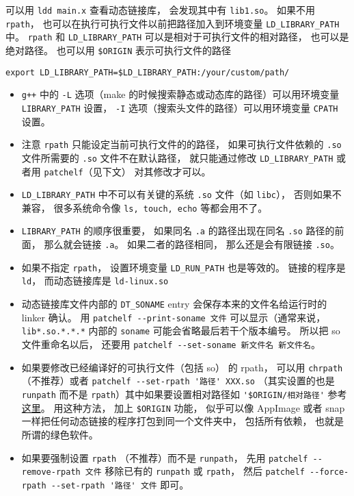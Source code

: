 可以用 \verb|ldd main.x| 查看动态链接库， 会发现其中有 \verb|lib1.so|。 如果不用 \verb|rpath|， 也可以在执行可执行文件以前把路径加入到环境变量 \verb`LD_LIBRARY_PATH` 中。 \verb|rpath| 和 \verb|LD_LIBRARY_PATH| 可以是相对于可执行文件的相对路径， 也可以是绝对路径。 也可以用 \verb|$ORIGIN| 表示可执行文件的路径
\begin{lstlisting}[language=none]
export LD_LIBRARY_PATH=$LD_LIBRARY_PATH:/your/custom/path/
\end{lstlisting}
\begin{itemize}
\item \verb|g++| 中的 \verb|-L| 选项（make 的时候搜索静态或动态库的路径）可以用环境变量 \verb|LIBRARY_PATH| 设置， \verb|-I| 选项（搜索头文件的路径）可以用环境变量 \verb|CPATH| 设置。
\item 注意 \verb|rpath| 只能设定当前可执行文件的的路径， 如果可执行文件依赖的 \verb|.so| 文件所需要的 \verb|.so| 文件不在默认路径， 就只能通过修改 \verb`LD_LIBRARY_PATH` 或者用 \verb|patchelf|（见下文） 对其修改才可以。
\item \verb|LD_LIBRARY_PATH| 中不可以有关键的系统 \verb|.so| 文件（如 \verb|libc|）， 否则如果不兼容， 很多系统命令像 \verb|ls, touch, echo| 等都会用不了。
\item \verb|LIBRARY_PATH| 的顺序很重要， 如果同名 \verb|.a| 的路径出现在同名 \verb|.so| 路径的前面， 那么就会链接 \verb|.a|。 如果二者的路径相同， 那么还是会有限链接 \verb|.so|。
\item 如果不指定 \verb|rpath|， 设置环境变量 \verb|LD_RUN_PATH| 也是等效的。 链接的程序是 \verb|ld|， 而动态链接库是 \verb|ld-linux.so|
\item 动态链接库文件内部的 \verb|DT_SONAME| entry 会保存本来的文件名给运行时的 linker 确认。 用 \verb|patchelf --print-soname 文件| 可以显示（通常来说， \verb|lib*.so.*.*.*| 内部的 \verb|soname| 可能会省略最后若干个版本编号。 所以把 so 文件重命名以后， 还要用 \verb|patchelf --set-soname 新文件名 新文件名|。
\item 如果要修改已经编译好的可执行文件（包括 so） 的 rpath， 可以用 \verb|chrpath| （不推荐）或者 \verb|patchelf --set-rpath '路径' XXX.so| （其实设置的也是 \verb|runpath| 而不是 \verb|rpath|）其中如果要设置相对路径如 \verb|'$ORIGIN/相对路径'| 参考\href{https://stackoverflow.com/questions/13769141/can-i-change-rpath-in-an-already-compiled-binary}{这里}。 用这种方法， 加上 \verb|$ORIGIN| 功能， 似乎可以像 AppImage 或者 snap 一样把任何动态链接的程序打包到同一个文件夹中， 包括所有依赖， 也就是所谓的绿色软件。
\item 如果要强制设置 \verb|rpath| （不推荐）而不是 \verb|runpath|， 先用 \verb|patchelf --remove-rpath 文件| 移除已有的 \verb|runpath| 或 \verb|rpath|， 然后 \verb|patchelf --force-rpath --set-rpath '路径' 文件| 即可。

\end{itemize}
